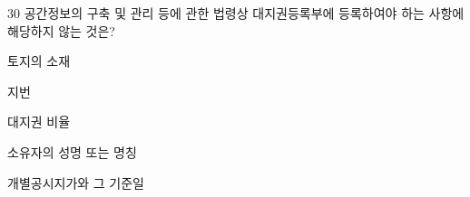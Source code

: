 \begin{question}{30}
공간정보의 구축 및 관리 등에 관한 법령상 대지권등록부에 등록하여야 하는 사항에 해당하지 않는 것은?
\begin{choices}
  \item 토지의 소재
  \item 지번
  \item 대지권 비율
  \item 소유자의 성명 또는 명칭
  \item 개별공시지가와 그 기준일
\end{choices}
\end{question}
